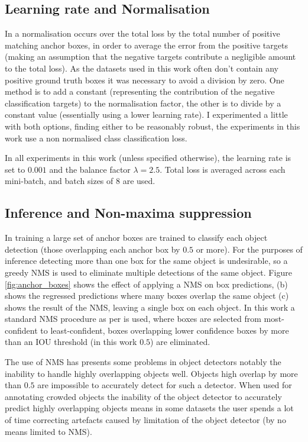 \subsection {Learning rate and Normalisation}

In \cite{Lin2017} a normalisation occurs over the total loss by the total number of positive matching anchor boxes, in order to average the error from the positive targets (making an assumption that the negative targets contribute a negligible amount to the total loss). As the datasets used in this work often don't contain any positive ground truth boxes it was necessary to avoid a division by zero. One method is to add a constant (representing the contribution of the negative classification targets) to the normalisation factor, the other is to divide by a constant value (essentially using a lower learning rate). I experimented a little with both options, finding either to be reasonably robust, the experiments in this work use a non normalised class classification loss.

In all experiments in this work (unless specified otherwise), the learning rate is set to $0.001$ and the balance factor $\lambda=2.5$. Total loss is averaged across each mini-batch, and batch sizes of $8$ are used.

\subsection{Inference and Non-maxima suppression}

In training a large set of anchor boxes are trained to classify each object detection (those overlapping each anchor box by $0.5$ or more). For the purposes of inference detecting more than one box for the same object is undesirable, so a greedy \gls{NMS} is used to eliminate multiple detections of the same object. Figure \ref{fig:anchor_boxes} shows the effect of applying a \gls{NMS} on box predictions, (b) shows the regressed predictions where many boxes overlap the same object (c) shows the result of the \gls{NMS}, leaving a single box on each object. In this work a standard \gls{NMS} procedure as per \cite{Wang2017} is used, where boxes are selected from most-confident to least-confident, boxes overlapping lower confidence boxes by more than an \gls{IOU} threshold (in this work $0.5$) are eliminated.

The use of \gls{NMS} has presents some problems in object detectors notably the inability to handle highly overlapping objects well. Objects high overlap by more than $0.5$ are impossible to accurately detect for such a detector. When used for annotating crowded objects the inability of the object detector to accurately predict highly overlapping objects means in some datasets the user spends a lot of time correcting artefacts caused by limitation of the object detector (by no means limited to \gls{NMS}).


